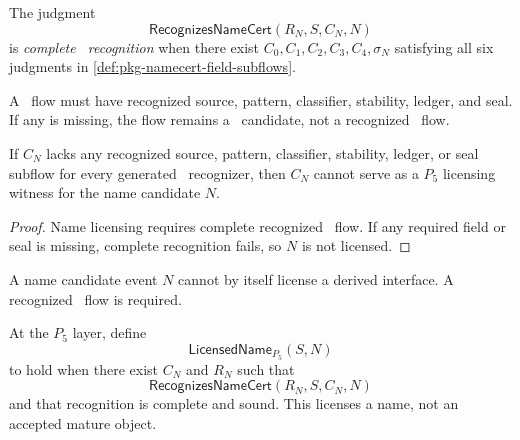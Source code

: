 \begin{definition}
\label{def:pkg-namecert-complete-namecert-recognition}
The judgment
$$
  \mathsf{RecognizesNameCert}(R_N,S,C_N,N)
$$
is \emph{complete \NameCert\ recognition} when there exist $C_0,C_1,C_2,C_3,C_4,\sigma_N$ satisfying all six judgments in \autoref{def:pkg-namecert-field-subflows}.
\end{definition}

\begin{principle}
\label{prin:pkg-namecert-no-namecert-without-five-fields}
A \NameCert\ flow must have recognized source, pattern, classifier, stability, ledger, and seal. If any is missing, the flow remains a \NameCert\ candidate, not a recognized \NameCert\ flow.
\end{principle}

\begin{theorem}
\label{thm:pkg-namecert-incomplete-namecert-cannot-license}
If $C_N$ lacks any recognized source, pattern, classifier, stability, ledger, or seal subflow for every generated \NameCert\ recognizer, then $C_N$ cannot serve as a $P_5$ licensing witness for the name candidate $N$.
\end{theorem}

\begin{proof}
Name licensing requires complete recognized \NameCert\ flow. If any required field or seal is missing, complete recognition fails, so $N$ is not licensed.
\end{proof}

\begin{corollary}
\label{cor:pkg-namecert-name-event-not-license}
A name candidate event $N$ cannot by itself license a derived interface. A recognized \NameCert\ flow is required.
\end{corollary}

\begin{definition}
\label{def:pkg-namecert-licensed-name-p5}
At the $P_5$ layer, define
$$
  \mathsf{LicensedName}_{P_5}(S,N)
$$
to hold when there exist $C_N$ and $R_N$ such that
$$
  \mathsf{RecognizesNameCert}(R_N,S,C_N,N)
$$
and that recognition is complete and sound. This licenses a name, not an accepted mature object.
\end{definition}

